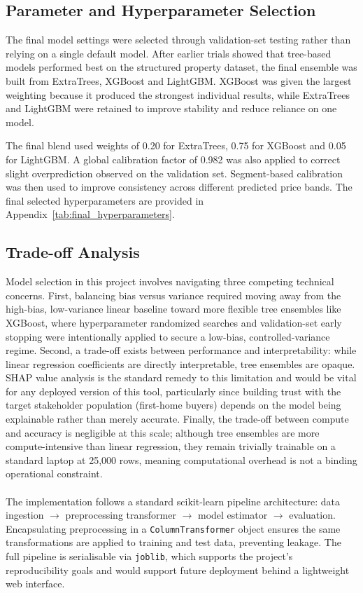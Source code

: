 \documentclass[a4paper,12pt]{article}
\begin{document}
\subsection{Parameter and Hyperparameter Selection}
\label{sec:hyperparam}

The final model settings were selected through validation-set testing rather than relying on a single default model. After earlier trials showed that tree-based models performed best on the structured property dataset, the final ensemble was built from ExtraTrees, XGBoost and LightGBM. XGBoost was given the largest weighting because it produced the strongest individual results, while ExtraTrees and LightGBM were retained to improve stability and reduce reliance on one model.

The final blend used weights of 0.20 for ExtraTrees, 0.75 for XGBoost and 0.05 for LightGBM. A global calibration factor of 0.982 was also applied to correct slight overprediction observed on the validation set. Segment-based calibration was then used to improve consistency across different predicted price bands. The final selected hyperparameters are provided in Appendix~\ref{tab:final_hyperparameters}.

\subsection{Trade-off Analysis}
Model selection in this project involves navigating three competing technical concerns. First, balancing bias versus variance required moving away from the high-bias, low-variance linear baseline toward more flexible tree ensembles like XGBoost, where hyperparameter randomized searches and validation-set early stopping were intentionally applied to secure a low-bias, controlled-variance regime. Second, a trade-off exists between performance and interpretability: while linear regression coefficients are directly interpretable, tree ensembles are opaque. SHAP value analysis is the standard remedy to this limitation and would be vital for any deployed version of this tool, particularly since building trust with the target stakeholder population (first-home buyers) depends on the model being explainable rather than merely accurate. Finally, the trade-off between compute and accuracy is negligible at this scale; although tree ensembles are more compute-intensive than linear regression, they remain trivially trainable on a standard laptop at 25,000 rows, meaning computational overhead is not a binding operational constraint.
\\
\\
The implementation follows a standard scikit-learn pipeline architecture: data ingestion $\rightarrow$ preprocessing transformer $\rightarrow$ model estimator $\rightarrow$ evaluation. Encapsulating preprocessing in a \texttt{ColumnTransformer} object ensures the same transformations are applied to training and test data, preventing leakage. The full pipeline is serialisable via \texttt{joblib}, which supports the project's reproducibility goals and would support future deployment behind a lightweight web interface.
\end{document}
